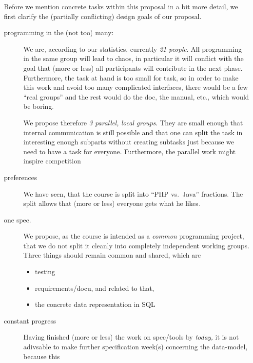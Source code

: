 \documentclass[11pt,handout]{handout}
\begin{document}
Before we mention concrete tasks within this proposal in a bit more detail,
we first clarify the (partially conflicting) design goals of our proposal.
\begin{description}
\item[programming in the (not too) many:] We are, according to our
  statistics, currently \emph{21 people}. All programming in the same group
  will lead to chaos, in particular it will conflict with the goal that
  (more or less) all participants will contribute in the next phase.
  Furthermore, the task at hand is too small for task, so in order to make
  this work and avoid too many complicated interfaces, there would be a few
  ``real groups'' and the rest would do the doc, the manual, etc., which
  would be boring.
  
  We propose therefore \emph{3 parallel, local groups.} They are small
  enough that internal communication is still possible and that one can
  split the task in interesting enough subparts without creating subtasks
  just because we need to have a task for everyone.  Furthermore, the
  parallel work might inspire competition
\item[preferences] We have seen, that the course is split into ``PHP vs.\ 
  Java'' fractions. The split allows that (more or less) everyone gets what
  he likes.
\item[one spec.] We propose, as the course is intended as a \emph{common}
  programming project, that we do not split it cleanly into completely
  independent working groups. Three things should remain common and shared,
  which are
  \begin{itemize}
  \item testing
  \item requirements/docu, and related to that, 
  \item the concrete data representation in SQL
  \end{itemize}
\item[constant progress] Having finished (more or less) the work on
  spec/tools by \emph{today,} it is not adivsable to make further
  specification week(s) concerning the data-model, because this 
\end{description}
\end{document}
